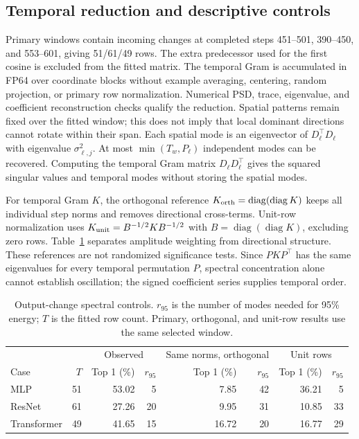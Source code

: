 \subsection{Temporal reduction and descriptive controls}
Primary windows contain incoming changes at completed steps 451--501, 390--450, and 553--601, giving 51/61/49 rows. The extra predecessor used for the first cosine is excluded from the fitted matrix. The temporal Gram is accumulated in FP64 over coordinate blocks without example averaging, centering, random projection, or primary row normalization. Numerical PSD, trace, eigenvalue, and coefficient reconstruction checks qualify the reduction. Spatial patterns remain fixed over the fitted window; this does not imply that local dominant directions cannot rotate within their span. Each spatial mode is an eigenvector of $D_\ell^\top D_\ell$ with eigenvalue $\sigma_{\ell,j}^2$. At most $\min(T_w,P_\ell)$ independent modes can be recovered. Computing the temporal Gram matrix $D_\ell D_\ell^\top$ gives the squared singular values and temporal modes without storing the spatial modes.

For temporal Gram $K$, the orthogonal reference $K_{\rm orth}=\operatorname{diag}(\operatorname{diag}K)$ keeps all individual step norms and removes directional cross-terms. Unit-row normalization uses $K_{\rm unit}=B^{-1/2}KB^{-1/2}$ with $B=\operatorname{diag}(\operatorname{diag}K)$, excluding zero rows. Table~\ref{tab:t-spectral} separates amplitude weighting from directional structure. These references are not randomized significance tests. Since $PKP^\top$ has the same eigenvalues for every temporal permutation $P$, spectral concentration alone cannot establish oscillation; the signed coefficient series supplies temporal order.

\begin{table}[H]
\centering\small
\caption{Output-change spectral controls. $r_{95}$ is the number of modes needed for 95\% energy; $T$ is the fitted row count. Primary, orthogonal, and unit-row results use the same selected window.}
\label{tab:t-spectral}
\setlength{\tabcolsep}{6pt}
\begin{tabular}{@{}lr rr rr rr@{}}
\toprule
 & & \multicolumn{2}{c}{Observed} & \multicolumn{2}{c}{Same norms, orthogonal} & \multicolumn{2}{c}{Unit rows} \\
Case & $T$ & Top 1 (\%) & $r_{95}$ & Top 1 (\%) & $r_{95}$ & Top 1 (\%) & $r_{95}$ \\
\midrule
MLP & 51 & 53.02 & 5 & 7.85 & 42 & 36.21 & 5 \\
ResNet & 61 & 27.26 & 20 & 9.95 & 31 & 10.85 & 33 \\
Transformer & 49 & 41.65 & 15 & 16.72 & 20 & 16.77 & 29 \\
\bottomrule
\end{tabular}
\end{table}

